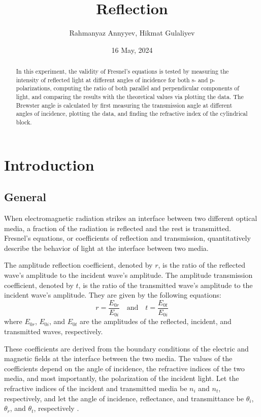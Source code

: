 \documentclass[10pt]{article}
\title{Reflection}
\author{Rahmanyaz Annyyev, Hikmat Gulaliyev}
\date{16 May, 2024}
\begin{document}
\maketitle

\begin{abstract}
In this experiment, the validity of Fresnel's equations is tested by measuring the intensity of reflected light at different angles of incidence for both s- and p-polarizations, computing the ratio of both parallel and perpendicular components of light, and comparing the results with the theoretical values via plotting the data. The Brewster angle is calculated by first measuring the transmission angle at different angles of incidence, plotting the data, and finding the refractive index of the cylindrical block. 
\end{abstract}

\section{Introduction}

\subsection*{General}

When electromagnetic radiation strikes an interface between two different optical media, a fraction of the radiation is reflected and the rest is transmitted. Fresnel's equations, or coefficients of reflection and transmission, quantitatively describe the behavior of light at the interface between two media. 

The amplitude reflection coefficient, denoted by $r$, is the ratio of the reflected wave's amplitude to the incident wave's amplitude. The amplitude transmission coefficient, denoted by $t$, is the ratio of the transmitted wave's amplitude to the incident wave's amplitude. They are given by the following equations:
\begin{equation}
  r = \frac{E_{0r}}{E_{0i}} \quad \text{and} \quad t = \frac{E_{0t}}{E_{0i}}
\end{equation}
where $E_{0r}$, $E_{0i}$, and $E_{0t}$ are the amplitudes of the reflected, incident, and transmitted waves, respectively.

These coefficients are derived from the boundary conditions of the electric and magnetic fields at the interface between the two media. The values of the coefficients depend on the angle of incidence, the refractive indices of the two media, and most importantly, the polarization of the incident light. Let the refractive indices of the incident and transmitted media be $n_i$ and $n_t$, respectively, and let the angle of incidence, reflectance, and transmittance be $\theta_i$, $\theta_r$, and $\theta_t$, respectively \cite{Pedrotti_2006}.
\end{document}
